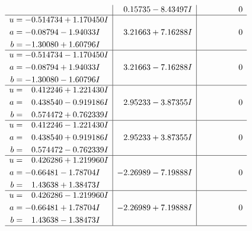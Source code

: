 \documentclass[1p]{elsarticle_modified}
\theoremstyle{definition}
\begin{document}
$$\begin{array}{c|c|c}
 & \phantom{-}0.15735 - 8.43497 I & \phantom{-0.000000 } 0 \\ \hline\begin{aligned}
u &= -0.514734 + 1.170450 I \\
a &= -0.08794 - 1.94033 I \\
b &= -1.30080 + 1.60796 I\end{aligned}
 & \phantom{-}3.21663 + 7.16288 I & \phantom{-0.000000 } 0 \\ \hline\begin{aligned}
u &= -0.514734 - 1.170450 I \\
a &= -0.08794 + 1.94033 I \\
b &= -1.30080 - 1.60796 I\end{aligned}
 & \phantom{-}3.21663 - 7.16288 I & \phantom{-0.000000 } 0 \\ \hline\begin{aligned}
u &= \phantom{-}0.412246 + 1.221430 I \\
a &= \phantom{-}0.438540 - 0.919186 I \\
b &= \phantom{-}0.574472 + 0.762339 I\end{aligned}
 & \phantom{-}2.95233 - 3.87355 I & \phantom{-0.000000 } 0 \\ \hline\begin{aligned}
u &= \phantom{-}0.412246 - 1.221430 I \\
a &= \phantom{-}0.438540 + 0.919186 I \\
b &= \phantom{-}0.574472 - 0.762339 I\end{aligned}
 & \phantom{-}2.95233 + 3.87355 I & \phantom{-0.000000 } 0 \\ \hline\begin{aligned}
u &= \phantom{-}0.426286 + 1.219960 I \\
a &= -0.66481 - 1.78704 I \\
b &= \phantom{-}1.43638 + 1.38473 I\end{aligned}
 & -2.26989 - 7.19888 I & \phantom{-0.000000 } 0 \\ \hline\begin{aligned}
u &= \phantom{-}0.426286 - 1.219960 I \\
a &= -0.66481 + 1.78704 I \\
b &= \phantom{-}1.43638 - 1.38473 I\end{aligned}
 & -2.26989 + 7.19888 I & \phantom{-0.000000 } 0\\
 \hline 
 \end{array}$$\newpage$$\begin{array}{c|c|c}  

\end{array}$$
\end{document}
